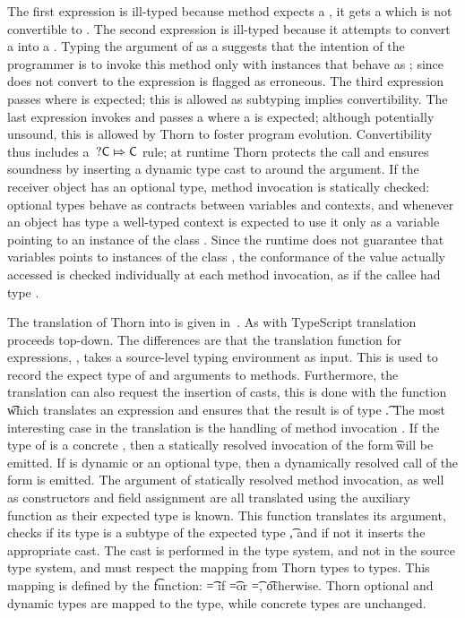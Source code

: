 \documentclass{tex/llncs}
\begin{document}
The first expression is ill-typed because method \n expects a \C, it gets
a \D which is not convertible to \C. The second expression is ill-typed
because it attempts to convert a \D into a \dt\C.  Typing the argument of \m
as a \dt\C suggests that the intention of the programmer is to invoke this
method only with instances that behave as \C; since \D does not convert to
\C the expression is flagged as erroneous. The third expression passes \C
where \dt\C is expected; this is allowed as subtyping implies
convertibility.  The last expression invokes \n and passes a \dt\C where a
\C is expected; although potentially unsound, this is allowed by Thorn to
foster program evolution.  Convertibility thus includes a \(\dt\C\Mapsto\C\)
rule; at runtime Thorn protects the call and ensures soundness by inserting
a dynamic type cast to \C around the argument.  If the receiver object has
an optional type, method invocation is statically checked: optional types
behave as contracts between variables and contexts, and whenever an object
has type \dt\C a well-typed context is expected to use it only as a variable
pointing to an instance of the class \C.  Since the runtime does not
guarantee that \dt\C variables points to instances of the class \C, the
conformance of the value actually accessed is checked individually at each
method invocation, as if the callee had type \any.

The translation of Thorn into \kafka is given in~. As with
TypeScript translation proceeds top-down. The differences are that the
translation function for expressions, \TRG{\e}\Env, takes a source-level
typing environment as input. This is used to record the expect type of \this
and arguments \x to methods. Furthermore, the translation can also request
the insertion of casts, this is done with the function \TAG{\e}\Env\t which
translates an expression and ensures that the result is of type \t. The most
interesting case in the translation is the handling of method invocation
\Call\e\m\ep. If the type of \e is a concrete \C, then a statically resolved
invocation of the form \KCall\e\m\ep\t\tp will be emitted. If \e is dynamic
or an optional type, then a dynamically resolved call of the form
\DynCall\e\m\ep is emitted.  The argument of statically resolved method
invocation, as well as constructors and field assignment are all translated
using the auxiliary function as their expected type is known.  This function
translates its argument, checks if its type is a subtype of the expected
type \t, and if not it inserts the appropriate cast.  The cast is performed
in the \kafka type system, and not in the source type system, and must
respect the mapping from Thorn types to \kafka types.  This mapping is
defined by the \kty\t function: \kty\t = \any if \t=\dt\C or \t=\any, \t
otherwise.  Thorn optional and dynamic types are mapped to the \any type,
while concrete types are unchanged.
\end{document}
